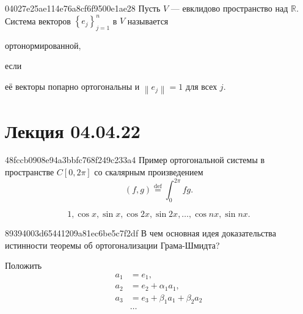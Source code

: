 \begin{note}{04027e25ae114e76a8cf6f9500e1ae28}
    Пусть \({ V }\) --- евклидово пространство над \({ \mathbb R }\).
    Система векторов \({ \left\{ e_j \right\}_{j = 1}^{n} }\) в \({ V }\) называется \begin{icloze}{2}ортонормированной,\end{icloze} если \begin{icloze}{1}её векторы попарно ортогональны и \({ \left\lVert e_j \right\rVert = 1 }\) для всех \({ j }\).\end{icloze}
\end{note}

\section{Лекция 04.04.22}
\begin{note}{48fccb0908e94a3bbfc768f249c233a4}
    Пример ортогональной системы в пространстве \({ C[0, 2\pi] }\) со скалярным произведением
    \[
        (f, g) \overset{\text{def}}= \int_{0}^{2\pi} f g.
    \]

    \begin{cloze}{1}
        \[
            1, \cos x, \sin x, \cos 2x, \sin 2x, \ldots, \cos nx, \sin nx.
        \]
    \end{cloze}
\end{note}


\begin{note}{89394003d65441209a81ec6be5c7f2df}
    В чем основная идея доказательства истинности теоремы об ортогонализации Грама-Шмидта?

    \begin{cloze}{1}
        Положить
        \begin{align*}
            a_1 &= e_1, \\
            a_2 &= e_2 + \alpha_1 a_1, \\
            a_3 &= e_3 + \beta_1 a_1 + \beta_2 a_2 \\
                &\ldots
        \end{align*}
    \end{cloze}
\end{note}

